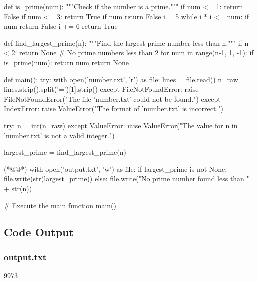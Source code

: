 \documentclass[11pt]{article}
\begin{document}
\begin{python}

def is_prime(num):
    """Check if the number is a prime."""
    if num <= 1:
        return False
    if num <= 3:
        return True
    if num %
        return False
    i = 5
    while i * i <= num:
        if num %
            return False
        i += 6
    return True

def find_largest_prime(n):
    """Find the largest prime number less than n."""
    if n < 2:
        return None  # No prime numbers less than 2
    for num in range(n-1, 1, -1):
        if is_prime(num):
            return num
    return None

def main():
    try:
        with open('number.txt', 'r') as file:
            lines = file.read()
        n_raw = lines.strip().split('=')[1].strip()
    except FileNotFoundError:
        raise FileNotFoundError("The file 'number.txt' could not be found.")
    except IndexError:
        raise ValueError("The format of 'number.txt' is incorrect.")

    try:
        n = int(n_raw)
    except ValueError:
        raise ValueError("The value for n in 'number.txt' is not a valid integer.")

    largest_prime = find_largest_prime(n)

(*@@*)    with open('output.txt', 'w') as file:
        if largest_prime is not None:
            file.write(str(largest_prime))
        else:
            file.write("No prime number found less than " + str(n))

# Execute the main function
main()

\end{python}



\subsection{Code Output}\hypertarget{file-output-txt}{}

\subsubsection*{\hyperlink{code-Prime Number Search-output-txt}{output.txt}}

\begin{codeoutput}
9973
\end{codeoutput}
\end{document}
